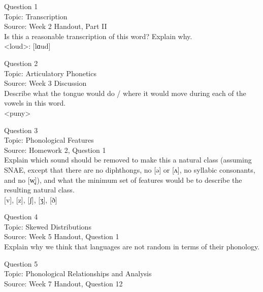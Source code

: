 \documentclass[12pt]{article}
\begin{document}
{\large Question 1}\\

Topic: Transcription\\
Source: Week 2 Handout, Part II\\

Is this a reasonable transcription of this word? Explain why.\\

<loud>: {[lɑud]}


\newpage

{\large Question 2}\\

Topic: Articulatory Phonetics\\
Source: Week 3 Discussion\\

Describe what the tongue would do / where it would move during each of the vowels in this word.\\

<puny>


\newpage

{\large Question 3}\\

Topic: Phonological Features\\
Source: Homework 2, Question 1\\

Explain which sound should be removed to make this a natural class (assuming SNAE, except that there are no diphthongs, no [ə] or [ʌ], no syllabic consonants, and no [w̥]), and what the minimum set of features would be to describe the resulting natural class.\\

{[v]}, {[z]}, {[ʃ]}, {[ʒ]}, {[ð]}


\newpage

{\large Question 4}\\

Topic: Skewed Distributions\\
Source: Week 5 Handout, Question 1\\

Explain why we think that languages are not random in terms of their phonology.\\


\newpage

{\large Question 5}\\

Topic: Phonological Relationships and Analysis\\
Source: Week 7 Handout, Question 12\\
\end{document}
